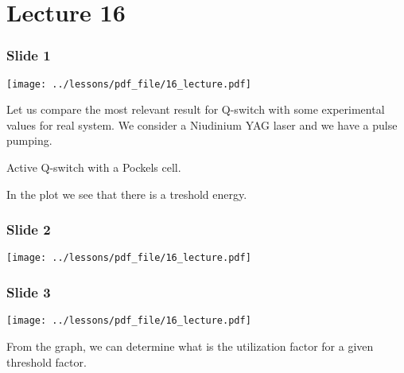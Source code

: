 \documentclass[../main/main.tex]{subfiles}
\begin{document}
\pagestyle{plain}

\section{Lecture 16}


\subsubsection*{Slide 1}

\begin{minipage}[]{0.5\linewidth}
\centering
\texttt{[image: ../lessons/pdf\_file/16\_lecture.pdf]}
\end{minipage}
\hspace{0.3cm}\vspace{0.3cm}
\begin{minipage}[c]{0.47\linewidth}

Let us compare the most relevant result for Q-switch with some experimental values for real system. We consider a Niudinium YAG laser and we have a pulse pumping.

Active Q-switch with a Pockels cell.

In the plot we see that there is a treshold energy.

\end{minipage}

\subsubsection*{Slide 2}

\begin{minipage}[]{0.5\linewidth}
\centering
\texttt{[image: ../lessons/pdf\_file/16\_lecture.pdf]}
\end{minipage}
\hspace{0.3cm}\vspace{0.3cm}
\begin{minipage}[c]{0.47\linewidth}



\end{minipage}

\subsubsection*{Slide 3}

\begin{minipage}[]{0.5\linewidth}
\centering
\texttt{[image: ../lessons/pdf\_file/16\_lecture.pdf]}
\end{minipage}
\hspace{0.3cm}\vspace{0.3cm}
\begin{minipage}[c]{0.47\linewidth}

From the graph, we can determine what is the utilization factor for a given threshold factor.

\end{minipage}
\end{document}
